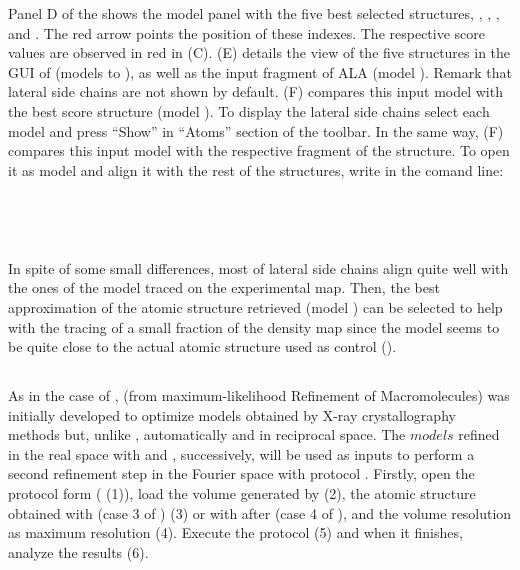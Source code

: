   Panel D of the  shows the \chimerax model panel with the five best selected structures, , , ,  and . The red arrow points the position of these indexes. The respective score values are observed in red in  (C).  (E) details the view of the five structures in the GUI of \chimera (models  to ), as well as the input fragment of ALA (model ). Remark that lateral side chains are not shown by default.  (F) compares this input model  with the best score structure (model ). To display the lateral side chains select each model and press ``Show'' in ``Atoms'' section of the toolbar. In the same way,  (F) compares this input model  with the respective fragment of the  structure. To open it as model  and align it with the rest of the structures, write in the \chimera comand line:\\
  \\
  \\
  \\
  \\
  In spite of some small differences, most of lateral side chains align quite well with the ones of the model  traced on the experimental map. Then, the best approximation of the atomic structure retrieved (model ) can be selected to help with the tracing of a small fraction of the density map since the model  seems to be quite close to the actual atomic structure used as control ().
  
  \subsection*{  }
  
  As in the case of \coot,  (from maximum-likelihood Refinement of Macromolecules) was initially developed to optimize models obtained by X-ray crystallography methods but, unlike \coot, automatically and in reciprocal space. The $models$ refined in the real space with \coot and \phenix {}, successively, will be used as inputs to perform a second refinement step in the Fourier space with  protocol . Firstly, open the  protocol form ( (1)), load the volume generated by \coot (2), the atomic structure obtained with \coot (case 3 of ) (3) or with \phenix {} after \coot (case 4 of ), and the volume resolution as maximum resolution (4). Execute the protocol (5) and when it finishes, analyze the results (6).
  

